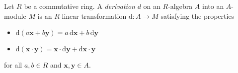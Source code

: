 \documentclass[12pt]{article}
\newcommand{\x}{\mathbf{x}}
\newcommand{\y}{\mathbf{y}}
\renewcommand{\d}{\mathrm{d}}
\begin{document}
Let $R$ be a commutative ring. A \emph{derivation} $d$ on an $R$-algebra $A$ into an $A$-module $M$ is an $R$-linear transformation $\d\colon A \to M$ satisfying the properties
\begin{itemize}
\item $\d(a\x+b\y) = a\,\d\x + b\,\d\y$
\item $\d(\x\cdot \y) = \x \cdot \d\y + \d\x \cdot \y$
\end{itemize}
for all $a,b \in R$ and $\x,\y \in A$.
\end{document}
